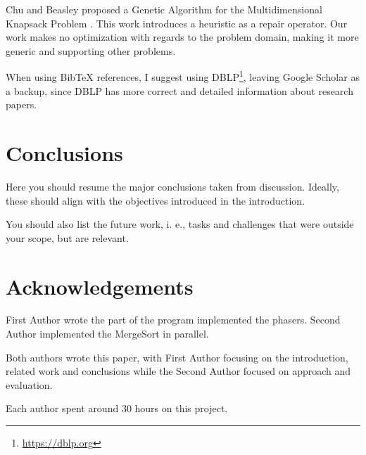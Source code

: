 \documentclass[runningheads]{llncs}
\begin{document}
Chu and Beasley proposed a Genetic Algorithm for the Multidimensional Knapsack Problem \cite{DBLP:journals/heuristics/ChuB98}. This work introduces a heuristic as a repair operator. Our work makes no optimization with regards to the problem domain, making it more generic and supporting other problems.


When using BibTeX references, I suggest using DBLP\footnote{\url{https://dblp.org}}, leaving Google Scholar as a backup, since DBLP has more correct and detailed information about research papers.

\section{Conclusions}

Here you should resume the major conclusions taken from discussion. Ideally, these should align with the objectives introduced in the introduction.


You should also list the future work, i. e., tasks and challenges that were outside your scope, but are relevant.

\section*{Acknowledgements}

First Author wrote the part of the program implemented the phasers. Second Author implemented the MergeSort in parallel. 

Both authors wrote this paper, with First Author focusing on the introduction, related work and conclusions while the Second Author focused on approach and evaluation.

Each author spent around 30 hours on this project.



\end{document}
